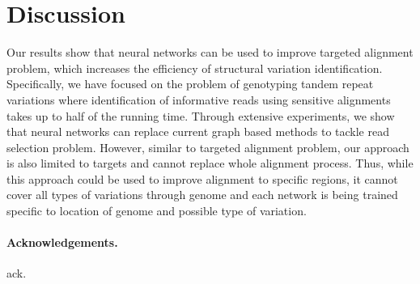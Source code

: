 \section{Discussion}\label{discussion}
Our results show that neural networks can be used to improve targeted alignment problem, which increases the efficiency of structural variation identification. Specifically, we have focused on the problem of genotyping tandem repeat variations where identification of informative reads using sensitive alignments takes up to half of the running time. Through extensive experiments, we show that neural networks can replace current graph based methods to tackle read selection problem. However, similar to targeted alignment problem, our approach is also limited to targets and cannot replace whole alignment process. Thus, while this approach could be used to improve alignment to specific regions, it cannot cover all types of variations through genome and each network is being trained specific to location of genome and possible type of variation.
\paragraph{Acknowledgements.} ack.
